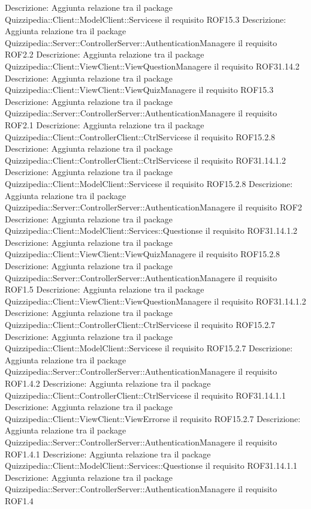 Descrizione: Aggiunta relazione tra il package Quizzipedia::Client::ModelClient::Servicese il requisito ROF15.3 
Descrizione: Aggiunta relazione tra il package Quizzipedia::Server::ControllerServer::AuthenticationManagere il requisito ROF2.2 
Descrizione: Aggiunta relazione tra il package Quizzipedia::Client::ViewClient::ViewQuestionManagere il requisito ROF31.14.2 
Descrizione: Aggiunta relazione tra il package Quizzipedia::Client::ViewClient::ViewQuizManagere il requisito ROF15.3 
Descrizione: Aggiunta relazione tra il package Quizzipedia::Server::ControllerServer::AuthenticationManagere il requisito ROF2.1 
Descrizione: Aggiunta relazione tra il package Quizzipedia::Client::ControllerClient::CtrlServicese il requisito ROF15.2.8 
Descrizione: Aggiunta relazione tra il package Quizzipedia::Client::ControllerClient::CtrlServicese il requisito ROF31.14.1.2 
Descrizione: Aggiunta relazione tra il package Quizzipedia::Client::ModelClient::Servicese il requisito ROF15.2.8 
Descrizione: Aggiunta relazione tra il package Quizzipedia::Server::ControllerServer::AuthenticationManagere il requisito ROF2 
Descrizione: Aggiunta relazione tra il package Quizzipedia::Client::ModelClient::Services::Questionse il requisito ROF31.14.1.2 
Descrizione: Aggiunta relazione tra il package Quizzipedia::Client::ViewClient::ViewQuizManagere il requisito ROF15.2.8 
Descrizione: Aggiunta relazione tra il package Quizzipedia::Server::ControllerServer::AuthenticationManagere il requisito ROF1.5 
Descrizione: Aggiunta relazione tra il package Quizzipedia::Client::ViewClient::ViewQuestionManagere il requisito ROF31.14.1.2 
Descrizione: Aggiunta relazione tra il package Quizzipedia::Client::ControllerClient::CtrlServicese il requisito ROF15.2.7 
Descrizione: Aggiunta relazione tra il package Quizzipedia::Client::ModelClient::Servicese il requisito ROF15.2.7 
Descrizione: Aggiunta relazione tra il package Quizzipedia::Server::ControllerServer::AuthenticationManagere il requisito ROF1.4.2 
Descrizione: Aggiunta relazione tra il package Quizzipedia::Client::ControllerClient::CtrlServicese il requisito ROF31.14.1.1 
Descrizione: Aggiunta relazione tra il package Quizzipedia::Client::ViewClient::ViewErrorse il requisito ROF15.2.7 
Descrizione: Aggiunta relazione tra il package Quizzipedia::Server::ControllerServer::AuthenticationManagere il requisito ROF1.4.1 
Descrizione: Aggiunta relazione tra il package Quizzipedia::Client::ModelClient::Services::Questionse il requisito ROF31.14.1.1 
Descrizione: Aggiunta relazione tra il package Quizzipedia::Server::ControllerServer::AuthenticationManagere il requisito ROF1.4 

